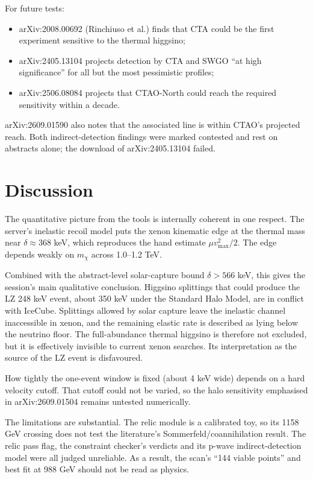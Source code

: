 \documentclass[11pt,a4paper]{article}
\begin{document}
For future tests:
\begin{itemize}
\item arXiv:2008.00692 (Rinchiuso et al.) finds that CTA could be the first experiment sensitive to the thermal higgsino;
\item arXiv:2405.13104 projects detection by CTA and SWGO ``at high significance'' for all but the most pessimistic profiles;
\item arXiv:2506.08084 projects that CTAO-North could reach the required sensitivity within a decade.
\end{itemize}
arXiv:2609.01590 also notes that the associated line is within CTAO's projected reach. Both indirect-detection findings were marked contested and rest on abstracts alone; the download of arXiv:2405.13104 failed.

\section{Discussion}
The quantitative picture from the tools is internally coherent in one respect. The server's inelastic recoil model puts the xenon kinematic edge at the thermal mass near $\delta \approx 368$ keV, which reproduces the hand estimate $\mu v_{\max}^2/2$. The edge depends weakly on $m_\chi$ across 1.0--1.2 TeV.

Combined with the abstract-level solar-capture bound $\delta > 566$ keV, this gives the session's main qualitative conclusion. Higgsino splittings that could produce the LZ 248 keV event, about 350 keV under the Standard Halo Model, are in conflict with IceCube. Splittings allowed by solar capture leave the inelastic channel inaccessible in xenon, and the remaining elastic rate is described as lying below the neutrino floor. The full-abundance thermal higgsino is therefore not excluded, but it is effectively invisible to current xenon searches. Its interpretation as the source of the LZ event is disfavoured.

How tightly the one-event window is fixed (about 4 keV wide) depends on a hard velocity cutoff. That cutoff could not be varied, so the halo sensitivity emphasised in arXiv:2609.01504 remains untested numerically.

The limitations are substantial. The relic module is a calibrated toy, so its 1158 GeV crossing does not test the literature's Sommerfeld/coannihilation result. The relic pass flag, the constraint checker's verdicts and its p-wave indirect-detection model were all judged unreliable. As a result, the scan's ``144 viable points'' and best fit at 988 GeV should not be read as physics.
\end{document}
